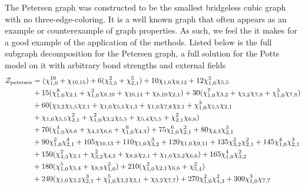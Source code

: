 \begin{center}
\TIKZpetersengraph 
\end{center} 
\noindent The Petersen graph was constructed to be the smallest bridgeless cubic graph with no three-edge-coloring.\cite{petersen_1898_sur} It is a well known graph that often appears as an example or counterexample of graph properties.\cite{bondy_1976_graph} As such, we feel the it makes for a good example of the application of the methods. Listed below is the full subgraph decomposition for the Petersen graph, a full solution for the Potts model on it with arbitrary bond strengths and external fields
{
\allowdisplaybreaks
\begin{align*}
\Z_\text{petersen}
 &= (\CHI{1,}{0}^{10}  + \CHI{10,}{15} ) + 6 (\CHI{5,}{5}^{2}  + \CHI{2,}{1}^{5} ) + 10 \CHI{1,}{0} \CHI{9,}{12}  + 12 \CHI{1,}{0}^{5} \CHI{5,}{5}  \\
 &+ 15 (\CHI{1,}{0}^{8} \CHI{2,}{1}  + \CHI{1,}{0}^{2} \CHI{8,}{10}  + \CHI{10,}{14}  + \CHI{8,}{10} \CHI{2,}{1} ) + 30 (\CHI{1,}{0}^{7} \CHI{3,}{2}  + \CHI{3,}{2} \CHI{7,}{8}  + \CHI{1,}{0}^{3} \CHI{7,}{8} ) \\
 &+ 60 (\CHI{3,}{2} \CHI{5,}{5} \CHI{2,}{1}  + \CHI{1,}{0} \CHI{5,}{5} \CHI{4,}{3}  + \CHI{1,}{0} \CHI{7,}{8} \CHI{2,}{1} + \CHI{1,}{0}^{3} \CHI{5,}{5} \CHI{2,}{1}  \\
      & + \CHI{1,}{0} \CHI{5,}{5} \CHI{2,}{1}^{2}  + \CHI{1,}{0}^{2} \CHI{3,}{2} \CHI{5,}{5}  + \CHI{5,}{4} \CHI{5,}{5}  + \CHI{2,}{1}^{2} \CHI{6,}{6} ) \\
 &+ 70 (\CHI{1,}{0}^{4} \CHI{6,}{6}  + \CHI{4,}{3} \CHI{6,}{6}  + \CHI{1,}{0}^{6} \CHI{4,}{3} ) + 75 \CHI{1,}{0}^{6} \CHI{2,}{1}^{2}  + 80 \CHI{4,}{3} \CHI{2,}{1}^{3}  \\
 &+ 90 \CHI{1,}{0}^{2} \CHI{2,}{1}^{4}  + 105 \CHI{10,}{13}  + 110 \CHI{1,}{0} \CHI{3,}{2}^{3}  + 120 \CHI{1,}{0} \CHI{9,}{11}  + 135 \CHI{3,}{2}^{2} \CHI{2,}{1}^{2}  + 145 \CHI{1,}{0}^{4} \CHI{2,}{1}^{3}  \\
 &+ 150 (\CHI{4,}{3}^{2} \CHI{2,}{1}  + \CHI{3,}{2}^{2} \CHI{4,}{3}  + \CHI{8,}{9} \CHI{2,}{1}  + \CHI{1,}{0} \CHI{3,}{2} \CHI{6,}{6} ) + 165 \CHI{1,}{0}^{4} \CHI{3,}{2}^{2}  \\
 &+ 180 (\CHI{1,}{0}^{5} \CHI{5,}{4}  + \CHI{8,}{9} \CHI{1,}{0}^{2} ) + 210 (\CHI{1,}{0}^{2} \CHI{2,}{1} \CHI{6,}{6}  + \CHI{5,}{4}^{2} ) \\
 &+ 240 (\CHI{1,}{0} \CHI{3,}{2} \CHI{2,}{1}^{3}  + \CHI{1,}{0}^{5} \CHI{3,}{2} \CHI{2,}{1}  + \CHI{3,}{2} \CHI{7,}{7} ) + 270 \CHI{1,}{0}^{2} \CHI{4,}{3}^{2}  + 300 \CHI{1,}{0}^{3} \CHI{7,}{7}  \\

\end{align*}}
